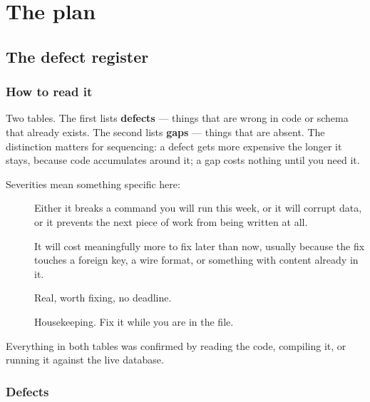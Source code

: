 \part{The plan}

\chapter{The defect register}
\label{ch:register}

\section{How to read it}

Two tables. The first lists \textbf{defects} --- things that are wrong in code or schema that
already exists. The second lists \textbf{gaps} --- things that are absent. The distinction matters
for sequencing: a defect gets more expensive the longer it stays, because code accumulates around
it; a gap costs nothing until you need it.

Severities mean something specific here:

\begin{description}
  \item[] Either it breaks a command you will run this week, or it will corrupt
    data, or it prevents the next piece of work from being written at all.
  \item[] It will cost meaningfully more to fix later than now, usually because the
    fix touches a foreign key, a wire format, or something with content already in it.
  \item[] Real, worth fixing, no deadline.
  \item[] Housekeeping. Fix it while you are in the file.
\end{description}

Everything in both tables was confirmed by reading the code, compiling it, or running it against
the live database.

\section{Defects}

